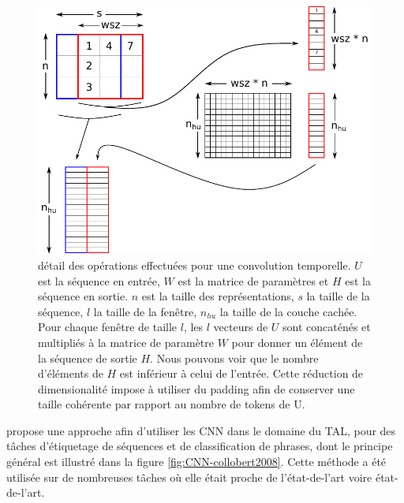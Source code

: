 \documentclass[PhD-Yoann-Dupont.tex]{subfiles}
\begin{document}
\begin{figure}[ht!]
    \centering
    \includegraphics[scale=0.8]{images/NN/convnet}
    \caption{détail des opérations effectuées pour une convolution temporelle. $U$ est la séquence en entrée, $W$ est la matrice de paramètres et $H$ est la séquence en sortie. $n$ est la taille des représentations, $s$ la taille de la séquence, $l$ la taille de la fenêtre, $n_{hu}$ la taille de la couche cachée. Pour chaque fenêtre de taille $l$, les $l$ vecteurs de $U$ sont concaténés et multipliés à la matrice de paramètre $W$ pour donner un élément de la séquence de sortie $H$. Nous pouvons voir que le nombre d'éléments de $H$ est inférieur à celui de l'entrée. Cette réduction de dimensionalité impose à utiliser du padding afin de conserver une taille cohérente par rapport au nombre de tokens de U.}
    \label{fig:CNN-detail}
\end{figure}

\citet{collobert2008unified} propose une approche afin d'utiliser les CNN dans le domaine du TAL, pour des tâches d'étiquetage de séquences et de classification de phrases, dont le principe général est illustré dans la figure \ref{fig:CNN-collobert2008}. Cette méthode a été utilisée sur de nombreuses tâches où elle était proche de l'état-de-l'art voire état-de-l'art.
\end{document}

